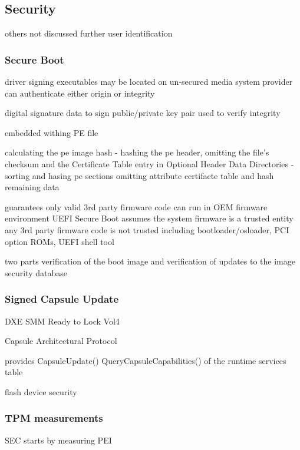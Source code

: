 
\subsection{Security}

others not discussed further
user identification

\subsubsection{Secure Boot}

driver signing
executables may be located on un-secured media
system provider can authenticate either origin or integrity

digital signature
data to sign
public/private key pair used to verify integrity

embedded withing PE file

calculating the pe image hash
- hashing the pe header, omitting the file's checksum and the Certificate Table entry in Optional Header Data Directories
- sorting and hasing pe sections
omitting attribute certifacte table and hash remaining data

\cite{microsoft-pe-signature-format}

guarantees only valid 3rd party firmware code can run in OEM firmware environment
UEFI Secure Boot assumes the system firmware is a trusted entity
any 3rd party firmware code is not trusted
including bootloader/osloader, PCI option ROMs, UEFI shell tool

two parts
verification of the boot image and verification of updates to the image security database
\cite{understanding-uefi-secure-boot-chain}

\subsubsection{Signed Capsule Update}

DXE SMM Ready to Lock Vol4

Capsule Architectural Protocol

provides
CapsuleUpdate()
QueryCapsuleCapabilities()
of the runtime services table

flash device security

\subsubsection{TPM measurements}



SEC starts by measuring PEI